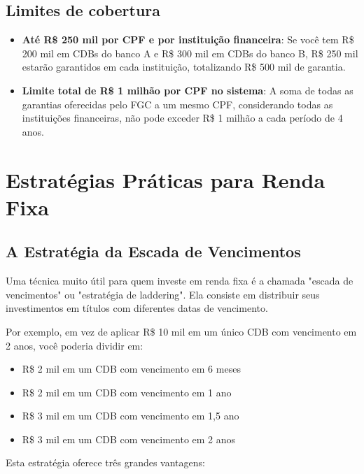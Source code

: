 \subsection{Limites de cobertura}

\begin{itemize}[leftmargin=*]
    \item \textbf{Até R\$ 250 mil por CPF e por instituição financeira}: Se você tem R\$ 200 mil em CDBs do banco A e R\$ 300 mil em CDBs do banco B, R\$ 250 mil estarão garantidos em cada instituição, totalizando R\$ 500 mil de garantia.
    
    \item \textbf{Limite total de R\$ 1 milhão por CPF no sistema}: A soma de todas as garantias oferecidas pelo FGC a um mesmo CPF, considerando todas as instituições financeiras, não pode exceder R\$ 1 milhão a cada período de 4 anos.
\end{itemize}

\section{Estratégias Práticas para Renda Fixa}

\subsection{A Estratégia da Escada de Vencimentos}

\noindent Uma técnica muito útil para quem investe em renda fixa é a chamada "escada de vencimentos" ou "estratégia de laddering". Ela consiste em distribuir seus investimentos em títulos com diferentes datas de vencimento.

\vspace{0.5cm}
\noindent Por exemplo, em vez de aplicar R\$ 10 mil em um único CDB com vencimento em 2 anos, você poderia dividir em:

\begin{itemize}[leftmargin=*]
    \item R\$ 2 mil em um CDB com vencimento em 6 meses
    \item R\$ 2 mil em um CDB com vencimento em 1 ano
    \item R\$ 3 mil em um CDB com vencimento em 1,5 ano
    \item R\$ 3 mil em um CDB com vencimento em 2 anos
\end{itemize}

\vspace{0.5cm}
\noindent Esta estratégia oferece três grandes vantagens:

